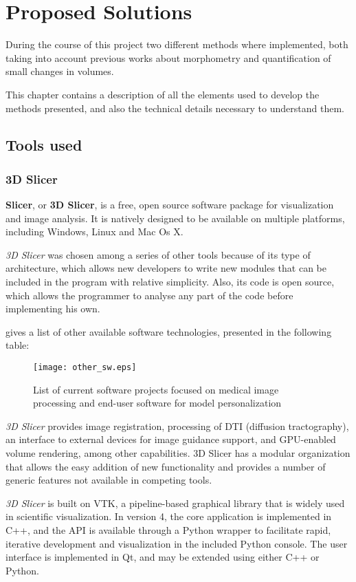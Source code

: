 \chapter{Proposed Solutions}
During the course of this project two different methods where
implemented, both taking into account previous works about morphometry
and quantification of small changes in volumes.

This chapter contains a description of all the elements used to
develop the methods presented, and also the technical details
necessary to understand them.


\section{Tools used}
\subsection{3D Slicer}
\textbf{Slicer}, or \textbf{3D Slicer}, is a free, open source
software package for visualization and image analysis. It is natively
designed to be available on multiple platforms, including Windows,
Linux and Mac Os X.

\textit{3D Slicer} was chosen among a series of other tools because of
its type of architecture, which allows new developers to write new
modules that can be included in the program with relative
simplicity. Also, its code is open source, which allows the programmer
to analyse any part of the code before implementing his own.

\cite{gimias} gives a list of other available software technologies, presented in the
following table:

\begin{figure}[H]
  \centering
  \texttt{[image: other\_sw.eps]}
  \caption{List of current software projects focused on medical image
    processing and end-user software for model personalization}
  \label{other_sw}
\end{figure}


\textit{3D Slicer} provides image registration, processing of DTI
(diffusion tractography), an interface to external devices for image
guidance support, and GPU-enabled volume rendering, among other
capabilities. 3D Slicer has a modular organization that allows the
easy addition of new functionality and provides a number of generic
features not available in competing tools.

\textit{3D Slicer} is built on VTK, a pipeline-based graphical library
that is widely used in scientific visualization. In version 4, the
core application is implemented in C++, and the API is available
through a Python wrapper to facilitate rapid, iterative development
and visualization in the included Python console. The user interface
is implemented in Qt, and may be extended using either C++ or Python.

